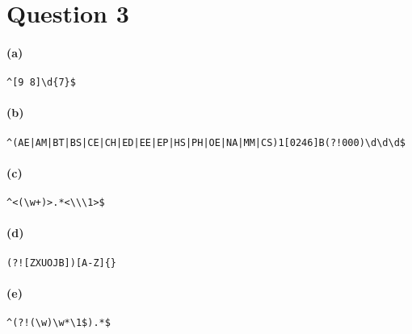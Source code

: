 \documentclass[12]{article}
\begin{document}
\section*{Question 3}
\paragraph*{(a)}
\verb|^[9 8]\d{7}$| 
\paragraph*{(b)}
\verb=^(AE|AM|BT|BS|CE|CH|ED|EE|EP|HS|PH|OE|NA|MM|CS)1[0246]B(?!000)\d\d\d$=
\paragraph*{(c)}
\verb|^<(\w+)>.*<\\\1>$|
\paragraph*{(d)}
\verb|(?![ZXUOJB])[A-Z]{}|
\paragraph*{(e)}
\verb|^(?!(\w)\w*\1$).*$|
\end{document}

